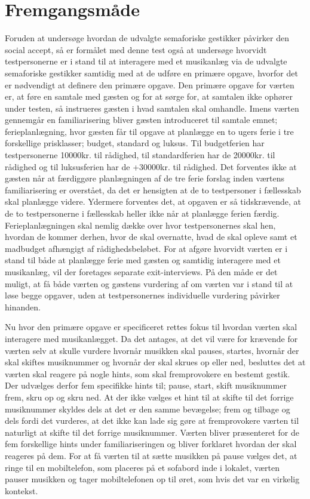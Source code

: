 \section{Fremgangsmåde}
\label{FremgangsmaadeSocialAccept}
%
Foruden at undersøge hvordan de udvalgte semaforiske gestikker påvirker den social accept, så er formålet med denne test også at undersøge hvorvidt testpersonerne er i stand til at interagere med et musikanlæg via de udvalgte semaforiske gestikker samtidig med at de udføre en primære opgave, hvorfor det er nødvendigt at definere den primære opgave. Den primære opgave for værten er, at føre en samtale med gæsten og for at sørge for, at samtalen ikke ophører under testen, så instrueres gæsten i hvad samtalen skal omhandle. Imens værten gennemgår en familiarisering bliver gæsten introduceret til samtale emnet; ferieplanlægning, hvor gæsten får til opgave at planlægge en to ugers ferie i tre forskellige prisklasser; budget, standard og luksus. Til budgetferien har testpersonerne 10000kr. til rådighed, til standardferien har de 20000kr. til rådighed og til luksusferien har de +30000kr. til rådighed. Det forventes ikke at gæsten når at færdiggøre planlægningen af de tre ferie forslag inden værtens familiarisering er overstået, da det er hensigten at de to testpersoner i fællesskab skal planlægge videre. Ydermere forventes det, at opgaven er så tidskrævende, at de to testpersonerne i fællesskab heller ikke når at planlægge ferien færdig. Ferieplanlægningen skal nemlig dække over hvor testpersonernes skal hen, hvordan de kommer derhen, hvor de skal overnatte, hvad de skal opleve samt et madbudget afhængigt af rådighedsbeløbet. For at afgøre hvorvidt værten er i stand til både at planlægge ferie med gæsten og samtidig interagere med et musikanlæg, vil der foretages separate exit-interviews. På den måde er det muligt, at få både værten og gæstens vurdering af om værten var i stand til at løse begge opgaver, uden at testpersonernes individuelle vurdering påvirker hinanden. 

Nu hvor den primære opgave er specificeret rettes fokus til hvordan værten skal interagere med musikanlægget. Da det antages, at det vil være for krævende for værten selv at skulle vurdere hvornår musikken skal pauses, startes, hvornår der skal skiftes musiknummer og hvornår der skal skrues op eller ned, besluttes det at værten skal reagere på nogle hints, som skal fremprovokere en bestemt gestik. Der udvælges derfor fem specifikke hints til; pause, start, skift musiknummer frem, skru op og skru ned. At der ikke vælges et hint til at skifte til det forrige musiknummer skyldes dels at det er den samme bevægelse; frem og tilbage og dels fordi det vurderes, at det ikke kan lade sig gøre at fremprovokere værten til naturligt at skifte til det forrige musiknummer. Værten bliver præsenteret for de fem forskellige hints under familiariseringen og bliver forklaret hvordan der skal reageres på dem. For at få værten til at sætte musikken på pause vælges det, at ringe til en mobiltelefon, som placeres på et sofabord inde i lokalet, værten pauser musikken og tager mobiltelefonen op til øret, som hvis det var en virkelig kontekst.   






